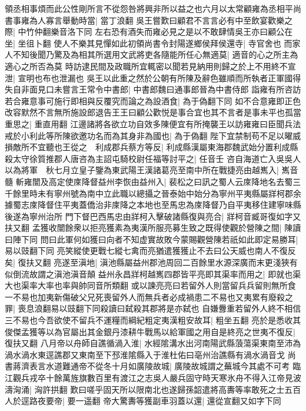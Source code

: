 領丞相事煩而此公性剛所言不從怨咎將興非所以益之也六月以太常顧雍為丞相平尚書事雍為人寡言舉動時當|{
	當丁浪翻}
吳王嘗歎曰顧君不言言必有中至飲宴歡樂之際|{
	中竹仲翻樂音洛下同}
左右恐有酒失而雍必見之是以不敢肆情吳王亦曰顧公在坐|{
	坐徂卜翻}
使人不樂其見憚如此初領尚書令封陽遂鄉侯拜侯還寺|{
	寺官舍也}
而家人不知後聞乃驚及為相其所選用文武將吏各隨能所任心無適莫|{
	適音的心之所主為適心之所否為莫}
時訪逮民間及政職所宜輒密以聞若見納用則歸之於上不用終不宣泄|{
	宣明也布也泄漏也}
吳王以此重之然於公朝有所陳及辭色雖順而所執者正軍國得失自非面見口未嘗言王常令中書郎|{
	中書郎魏曰通事郎晉為中書侍郎}
詣雍有所咨訪若合雍意事可施行即相與反覆究而論之為設酒食|{
	為于偽翻下同}
如不合意雍即正色改容默然不言無所施設郎退告王王曰顧公歡悦是事合宜也其不言者是事未平也孤當重思之|{
	重直用翻}
江邊諸將各欲立功自效多陳便宜有所掩襲王以訪雍雍曰臣聞兵法戒於小利此等所陳欲邀功名而為其身非為國也|{
	為于偽翻}
陛下宜禁制苟不足以曜威損敵所不宜聽也王從之　利成郡兵蔡方等反|{
	利成縣漢屬東海郡魏武始分置利成縣}
殺太守徐質推郡人唐咨為主詔屯騎校尉任福等討平之|{
	任音壬}
咨自海道亡入吳吳人以為將軍　秋七月立皇子鑒為東武陽王漢諸葛亮至南中所在戰捷亮由越嶲入|{
	嶲音髓}
斬雍闓及高定使庲降督益州李恢由益州入|{
	裴松之曰訊之蜀人云庲降地名去蜀三千餘里時未有寧州號為南中立此職以總攝之晉泰始中始分為寧州平夷縣屬牂柯郡余據蜀志庲降督住平夷蓋僑治非庲降之本地也至馬忠為庲降督乃自平夷移住建寧味縣後遂為寧州治所}
門下督巴西馬忠由牂柯入擊破諸縣復與亮合|{
	牂柯音臧哥復如字又扶又翻}
孟獲收闓餘衆以拒亮獲素為夷漢所服亮募生致之既得使觀於營陳之間|{
	陳讀曰陣下同}
問曰此軍何如獲曰向者不知虚實故敗今蒙賜觀營陳若祇如此即定易勝耳|{
	易以豉翻下同}
亮笑縱使更戰七縱七禽而亮猶遣獲獲止不去曰公天威也南人不復反矣|{
	復扶又翻}
亮遂至滇地|{
	滇池縣屬益州郡池周回二百餘里水源深廣而末更淺狹有似倒流故謂之滇池滇音顛}
益州永昌牂柯越嶲四郡皆平亮即其渠率而用之|{
	即就也渠大也渠率大率也率與帥同音所類翻}
或以諫亮亮曰若留外人則當留兵兵留則無所食一不易也加夷新傷破父兄死喪留外人而無兵者必成禍患二不易也又夷累有廢殺之罪|{
	喪息浪翻易以豉翻下同殺讀曰弑殺其郡將是亦弑也}
自嫌釁重若留外人終不相信三不易也今吾欲使不留兵不運糧而綱紀粗定夷漢粗安故耳|{
	粗坐五翻}
亮於是悉收其俊傑孟獲等以為官屬出其金銀丹漆耕牛戰馬以給軍國之用自是終亮之世夷不復反|{
	復扶又翻}
八月帝以舟師自譙循渦入淮|{
	水經隂溝水出河南陽武縣蒗蕩渠東南至沛為渦水渦水東逕譙郡又東南至下邳淮隂縣入于淮杜佑曰亳州治譙縣有渦水渦音戈}
尚書蔣濟表言水道難通帝不從冬十月如廣陵故城|{
	廣陵故城謂之蕪城今其處不可考}
臨江觀兵戎卒十餘萬旌旗數百里有渡江之志吳人嚴兵固守時天寒氷舟不得入江帝見波濤洶涌|{
	洶許拱翻}
歎曰嗟乎固天所以限南北也遂歸孫韶遣將高夀等率敢死之士五百人於逕路夜要帝|{
	要一遥翻}
帝大驚夀等獲副車羽蓋以還|{
	還從宣翻又如字下同}
